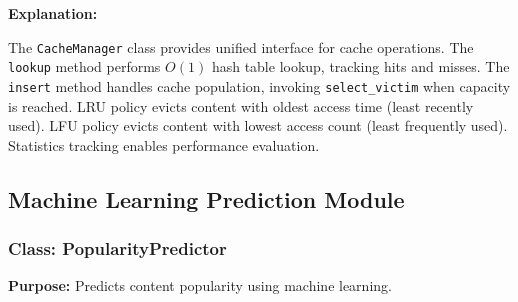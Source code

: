\documentclass[12pt,a4paper]{article}
\begin{document}
\textbf{Explanation:}

The \texttt{CacheManager} class provides unified interface for cache operations. The \texttt{lookup} method performs $O(1)$ hash table lookup, tracking hits and misses. The \texttt{insert} method handles cache population, invoking \texttt{select\_victim} when capacity is reached. LRU policy evicts content with oldest access time (least recently used). LFU policy evicts content with lowest access count (least frequently used). Statistics tracking enables performance evaluation.

\subsection{Machine Learning Prediction Module}

\subsubsection{Class: PopularityPredictor}

\textbf{Purpose:} Predicts content popularity using machine learning.
\end{document}
